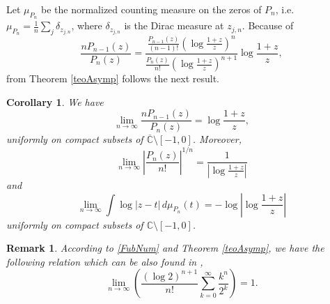 \documentclass[11pt]{article}
\newtheorem{rem}{Remark}
\newtheorem{cor}{Corollary}
\newcommand{\C}{\mathbb{C}}
\begin{document}
Let $\mu_{P_n}$ be the normalized counting measure on the zeros of $P_n$, i.e. $\mu_{P_n}=\frac1n\sum_{j}\delta_{z_{j,n}}$, where $\delta_{z_{j,n}}$ is the Dirac measure at $z_{j,n}$. Because of
\[
\frac{nP_{n-1}(z)}{P_n(z)}=\frac{\frac{P_{n-1}(z)}{(n-1)!}(\log\frac{1+z}{z})^n}{\frac{P_{n}(z)}{n!}(\log\frac{1+z}{z})^{n+1}}\log\frac{1+z}{z},
\]
from Theorem \ref{teoAsymp} follows the next result.


\begin{cor}\label{corLimRaizNesima} We have
\begin{equation*}
\label{limCociente}
\lim_{n\to\infty}\frac{nP_{n-1}(z)}{P_n(z)}={\log\frac{1+z}{z}},
\end{equation*}
uniformly on compact subsets of $\overline{\C}\setminus [-1,0]$. Moreover, 
\begin{equation*}
\label{corRaizLim}
\lim_{n\to\infty}\left|\frac{P_n(z)}{n!}\right|^{1/n}=\frac{1}{|\log\frac{1+z}{z}|}
\end{equation*}
and 
\begin{equation*}
\label{LimPotenciales}
\lim_{n\to\infty}\int\log|z-t|\, d\mu_{P_n}(t)=-\log \left|\log\frac{1+z}{z}\right|
\end{equation*}
uniformly on compact subsets of $\C\setminus [-1,0]$.
\end{cor}

\begin{rem} According to \eqref{FubNum} and Theorem \ref{teoAsymp}, we have the following relation which can be also found in \cite{Gro},
\[
\lim_{n\to\infty}\left(\frac{(\log 2)^{n+1}}{n!}\sum_{k=0}^\infty\frac{k^n}{2^k}\right)=1.
\]
\end{rem}
\end{document}
